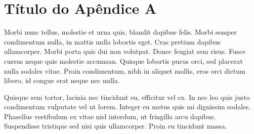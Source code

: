 %

\chapter{Título do Apêndice A}

Morbi nunc tellus, molestie et urna quis, blandit dapibus felis. Morbi semper condimentum nulla, in mattis nulla lobortis eget. Cras pretium dapibus ullamcorper. Morbi porta quis dui non volutpat. Donec feugiat sem risus. Fusce cursus neque quis molestie accumsan. Quisque lobortis purus orci, sed placerat nulla sodales vitae. Proin condimentum, nibh in aliquet mollis, eros orci dictum libero, id congue erat neque nec nulla.

Quisque sem tortor, lacinia nec tincidunt eu, efficitur vel ex. In nec leo quis justo condimentum vulputate vel ut lorem. Integer eu metus quis mi dignissim sodales. Phasellus vestibulum ex vitae nisl interdum, ut fringilla arcu dapibus. Suspendisse tristique sed nisi quis ullamcorper. Proin eu tincidunt massa.

